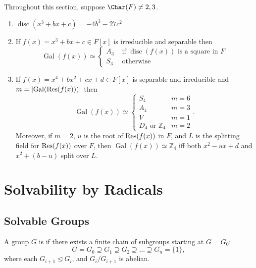 \documentclass[notoc,notitlepage,nobib]{tufte-book}
\DeclareMathOperator{\disc}{disc}
\DeclareMathOperator{\Gal}{Gal}
\begin{document}
Throughout this section, suppose $\Char(F) \neq 2, 3$.
\begin{enumerate}
  \item $\disc(x^3 + bx + c) = -4b^3 - 27c^2$ 
  \item If $f(x) = x^3 + bx + c \in F[x]$ is irreducible and separable then
    \begin{equation*}
      \Gal(f(x)) \simeq \begin{cases}
        A_3 & \text{ if } \disc(f(x)) \text{ is a square in } F \\
        S_3 & \text{ otherwise }
      \end{cases}
    \end{equation*}
  \item If $f(x) = x^4 + bx^2 + cx + d \in F[x]$ is separable and irreducible and $m =
    \abs{\Gal(\Res(f(x)))}$ then
    \begin{equation*}
      \Gal(f(x)) \simeq \begin{cases}
        S_4 & m = 6 \\
        A_4 & m = 3 \\
        V & m = 1 \\
        D_4 \text{ or } \mathbb{Z}_4 & m = 2
      \end{cases}.
    \end{equation*}
    Moreover, if $m = 2$, $u$ is the root of $\operatorname{Res}(f(x))$ in $F$, and $L$ is the splitting
    field for $\operatorname{Res}(f(x))$ over $F$, then $\Gal(f(x)) \simeq \mathbb{Z}_4$ iff both $x^2 -
    ux + d$ and $x^2 + (b - u)$ split over $L$.
\end{enumerate}



\section{Solvability by Radicals}%
\label{sec:solvability_by_radicals}

\subsection{Solvable Groups}%
\label{sub:solvable_groups}

\begin{defn}\label{defn:solvable_groups}
  A group $G$ is  if there exists a finite chain of subgroups
  starting at $G = G_0$:
  \begin{equation*}
    G = G_0 \supseteq G_1 \supseteq G_2 \supseteq \hdots \supseteq G_n = \{1\},
  \end{equation*}
  where each $G_{i + 1} \trianglelefteq G_i$, and  $G_i / G_{i+1}$ is abelian.
\end{defn}
\end{document}
